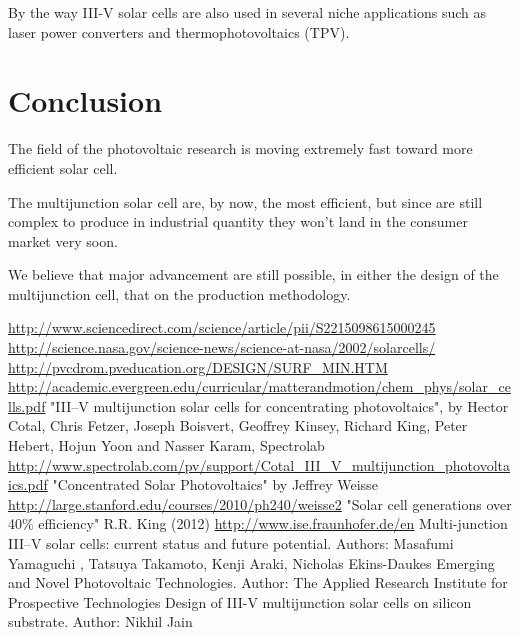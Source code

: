 \documentclass[11pt]{article} %
\begin{document}
 By the way III-V solar cells are also used in several niche applications such as laser power converters and thermophotovoltaics (TPV).
 

\section{Conclusion}

The field of the photovoltaic research is moving extremely fast toward more efficient solar cell.

The multijunction solar cell are, by now, the most efficient, but since are still complex to produce in industrial quantity they won't land in the consumer market very soon.

We believe that major advancement are still possible, in either the design of the multijunction cell, that on the production methodology.

\begin{thebibliography}{9}
\bibitem{}
\url{http://www.sciencedirect.com/science/article/pii/S2215098615000245}
\bibitem{}
\url{http://science.nasa.gov/science-news/science-at-nasa/2002/solarcells/}
\bibitem{}
\url{http://pvcdrom.pveducation.org/DESIGN/SURF_MIN.HTM}
\bibitem{}
\url{http://academic.evergreen.edu/curricular/matterandmotion/chem_phys/solar_cells.pdf}
\bibitem{}
	"III–V multijunction solar cells for concentrating photovoltaics", by Hector Cotal, Chris Fetzer, Joseph Boisvert, Geoffrey Kinsey, Richard King, Peter Hebert, Hojun Yoon and Nasser Karam, Spectrolab \url{http://www.spectrolab.com/pv/support/Cotal_III_V_multijunction_photovoltaics.pdf}
\bibitem{}
	"Concentrated Solar Photovoltaics" by Jeffrey Weisse \url{http://large.stanford.edu/courses/2010/ph240/weisse2}
\bibitem{}
	"Solar cell generations over 40\% efficiency" R.R. King (2012) 
\bibitem{}
	\url{http://www.ise.fraunhofer.de/en}
\bibitem{}
	Multi-junction III–V solar cells: current status and future potential. Authors: Masafumi Yamaguchi , Tatsuya Takamoto, Kenji Araki, Nicholas Ekins-Daukes 
\bibitem{}
	Emerging and Novel Photovoltaic Technologies. Author: The Applied Research Institute for Prospective Technologies  
\bibitem{}
	Design of III-V multijunction solar cells on silicon substrate. Author: Nikhil Jain 

\end{thebibliography}
\end{document}
